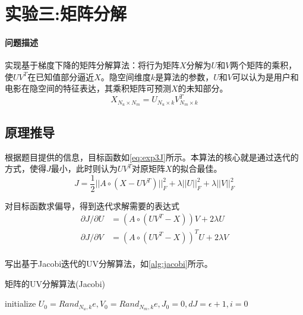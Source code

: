 \documentclass[a4paper,12pt]{article}
\begin{document}
    \section{实验三:矩阵分解}
    \paragraph{问题描述}
    实现基于梯度下降的矩阵分解算法：将行为矩阵$X$分解为$U$和$V$两个矩阵的乘积，使$UV^T$在已知值部分逼近$X$。隐空间维度$k$是算法的参数，$U$和$V$可以认为是用户和电影在隐空间的特征表达，其乘积矩阵可预测$X$的未知部分。
    $$
      X_{N_u\times N_m} = U_{N_u\times k}V_{N_m\times k}^T
    $$
    \subsection{原理推导}
    根据题目提供的信息，目标函数如\cref{eq:exp3J}所示。本算法的核心就是通过迭代的方式，使得$J$最小，此时则认为$UV^T$对原矩阵$X$的拟合最佳。
    \begin{equation}
      \label{eq:exp3J}
      J =\frac{1}{2} ||A\circ (X-UV^T)||_F^2 + \lambda ||U||_F^2 + \lambda ||V||_F^2
    \end{equation}

    对目标函数求偏导，得到迭代求解需要的表达式
    \begin{equation}
      \begin{aligned}
        \partial J/\partial U &= (A\circ (UV^T-X))V + 2\lambda U\\
        \partial J/\partial V &= (A\circ (UV^T-X))^TU + 2\lambda V\\
      \end{aligned}
    \end{equation}

    写出基于Jacobi迭代的UV分解算法，如\cref{alg:jacobi}所示。
    \begin{algorithm}
        \caption{矩阵的UV分解算法(Jacobi)}
        \label{alg:jacobi}

        initialize $U_0=Rand_{N_u,k}e, V_0=Rand_{N_m,k}e, J_0=0, dJ = \epsilon + 1, i=0$\;
    \end{algorithm}
\end{document}
